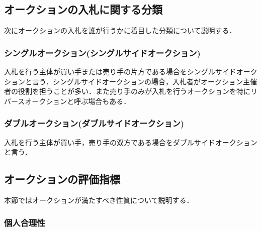\hypertarget{ux30aaux30fcux30afux30b7ux30e7ux30f3ux306eux5165ux672dux306bux95a2ux3059ux308bux5206ux985e}{%
\subsection{オークションの入札に関する分類}\label{ux30aaux30fcux30afux30b7ux30e7ux30f3ux306eux5165ux672dux306bux95a2ux3059ux308bux5206ux985e}}

次にオークションの入札を誰が行うかに着目した分類について説明する\cite{yokoo}．

\hypertarget{ux30b7ux30f3ux30b0ux30ebux30aaux30fcux30afux30b7ux30e7ux30f3ux30b7ux30f3ux30b0ux30ebux30b5ux30a4ux30c9ux30aaux30fcux30afux30b7ux30e7ux30f3}{%
\subsubsection{シングルオークション(シングルサイドオークション)}\label{ux30b7ux30f3ux30b0ux30ebux30aaux30fcux30afux30b7ux30e7ux30f3ux30b7ux30f3ux30b0ux30ebux30b5ux30a4ux30c9ux30aaux30fcux30afux30b7ux30e7ux30f3}}

入札を行う主体が買い手または売り手の片方である場合をシングルサイドオークションと言う．シングルサイドオークションの場合，入札者がオークション主催者の役割を担うことが多い．また売り手のみが入札を行うオークションを特にリバースオークションと呼ぶ場合もある．

\hypertarget{ux30c0ux30d6ux30ebux30aaux30fcux30afux30b7ux30e7ux30f3ux30c0ux30d6ux30ebux30b5ux30a4ux30c9ux30aaux30fcux30afux30b7ux30e7ux30f3}{%
\subsubsection{ダブルオークション(ダブルサイドオークション)}\label{ux30c0ux30d6ux30ebux30aaux30fcux30afux30b7ux30e7ux30f3ux30c0ux30d6ux30ebux30b5ux30a4ux30c9ux30aaux30fcux30afux30b7ux30e7ux30f3}}

入札を行う主体が買い手，売り手の双方である場合をダブルサイドオークションと言う．

\hypertarget{ux30aaux30fcux30afux30b7ux30e7ux30f3ux306eux8a55ux4fa1ux6307ux6a19}{%
\subsection{オークションの評価指標}\label{ux30aaux30fcux30afux30b7ux30e7ux30f3ux306eux8a55ux4fa1ux6307ux6a19}}

本節ではオークションが満たすべき性質について説明する．

\hypertarget{ux500bux4ebaux5408ux7406ux6027}{%
\subsubsection{個人合理性}\label{ux500bux4ebaux5408ux7406ux6027}}

